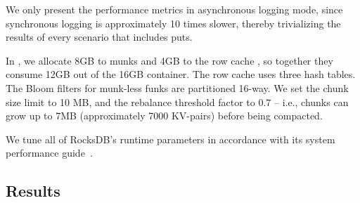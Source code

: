 We only present the performance metrics in asynchronous logging mode, since synchronous logging 
is approximately 10 times slower, thereby trivializing the results of every scenario that includes puts. 

In \sys, we allocate 8GB to munks and 4GB to the row cache , 
so together they consume 12GB out of the 16GB container. 
The row cache uses three hash tables.  
The Bloom filters for munk-less funks are partitioned 16-way.  
We set the \sys\/ chunk size limit to 10 MB, and the rebalance threshold factor to $0.7$ -- i.e., 
chunks can grow up to 7MB  (approximately 7000 KV-pairs) before being compacted. 

We tune all of RocksDB's runtime parameters in accordance with its system performance guide~\cite{RocksDBPerf}.   

\subsection{Results}
\label{ssec:results} 

